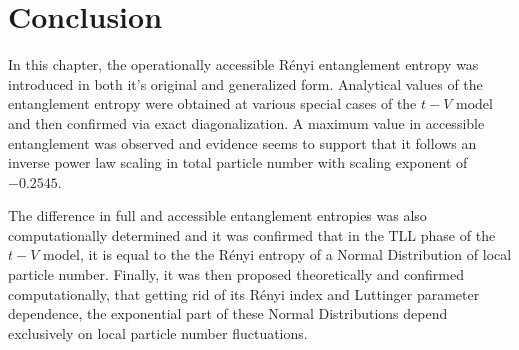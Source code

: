 \section{Conclusion}
In this chapter, the operationally accessible R\'enyi entanglement entropy was introduced in both it's original and generalized form. Analytical values of the entanglement entropy were obtained at various special cases of the $t-V$ model and then confirmed via exact diagonalization. A maximum value in accessible entanglement was observed and evidence seems to support that it follows an inverse power law scaling in total particle number with scaling exponent of $-0.2545$. 

The difference in full and accessible entanglement entropies was also computationally determined and it was confirmed that in the TLL phase of the $t-V$ model, it is equal to the the R\'enyi entropy of a Normal Distribution of local particle number. Finally, it was then proposed theoretically and confirmed computationally, that getting rid of its R\'enyi index and Luttinger parameter dependence, the exponential part of these Normal Distributions depend exclusively on local particle number fluctuations.


